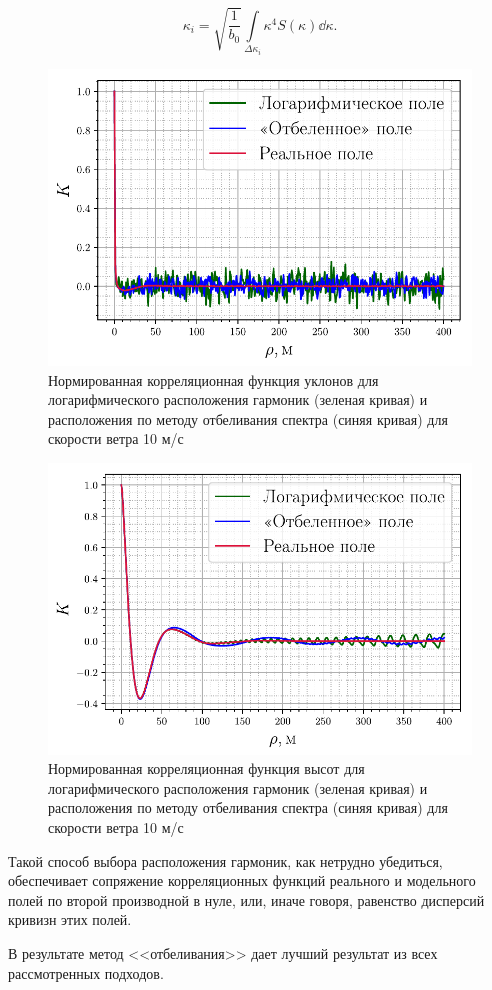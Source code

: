 \begin{equation}
    \label{eq:ki_slopes}
    {
        \kappa_i = \sqrt{\frac{1}{b_0}} \int\limits_{\Delta \kappa_i}
        \kappa^4 S(\kappa) \dd \kappa. 
    }
\end{equation}

\begin{figure}[ht]
    \centering
    \includegraphics[width=0.6\linewidth]{fig/correlation_angles_wa.pdf}
    \caption{ Нормированная корреляционная функция уклонов для логарифмического расположения
    гармоник (зеленая кривая) и расположения по методу отбеливания спектра
(синяя кривая) для скорости ветра 10 м/с}
    \label{fig:nodes}
\end{figure}

\begin{figure}[ht]
    \centering
    \includegraphics[width=0.6\linewidth]{fig/correlation_height_wa.pdf}
    \caption{ Нормированная корреляционная функция высот для логарифмического расположения
    гармоник (зеленая кривая) и расположения по методу отбеливания спектра
(синяя кривая) для скорости ветра 10 м/с}
\end{figure}
Такой способ выбора расположения гармоник, как нетрудно убедиться, обеспечивает
сопряжение корреляционных функций реального и модельного полей по второй
производной в нуле, или, иначе говоря, равенство дисперсий кривизн этих
полей.

В результате метод <<отбеливания>> дает лучший результат из всех рассмотренных подходов. 

